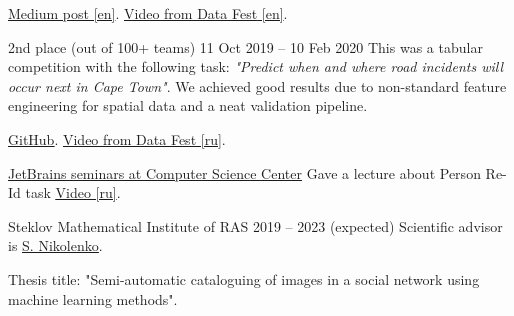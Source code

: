 \documentclass[10pt,a4paper,ragged2e,withhyper]{altacv}
\begin{document}
\begin{paracol}{2}
\href{https://medium.com/pytorch/metric-learning-with-catalyst-8c8337dfab1a}{\underline{Medium post} [en]}. \href{https://www.youtube.com/watch?v=a7sDJMDatZ4}{\underline{Video from Data Fest} [en]}.

\divider

{2nd place (out of 100+ teams)}
{11 Oct 2019 -- 10 Feb 2020}{}
This was a tabular competition with the following task: \textit{"Predict when and where road incidents will occur next in Cape Town"}. We achieved good results due to non-standard feature engineering for spatial data and a neat validation pipeline.
\smallskip

\href{https://github.com/AlekseySh/uber_competition}{\underline{GitHub}}.
\href{https://youtu.be/CliQ-EiYv5A}{\underline{Video from Data Fest} [ru]}.

\divider

\cvevent
{\href{https://research.jetbrains.org/groups/plt_lab/seminars}{JetBrains seminars at Computer Science Center}}
{Gave a lecture about Person Re-Id task}
{}
{}
{\href{https://youtu.be/O8qtBYeOSKE}{\underline{Video} [ru]}.}

\switchcolumn


\divider


\divider


\cvtag{\LaTeX}


{Steklov Mathematical Institute of RAS}
{2019 -- 2023 (expected)}{}
Scientific advisor is \href{https://logic.pdmi.ras.ru/~sergey/}
{\underline{S. Nikolenko}}.

\divider

Thesis title: "Semi-automatic cataloguing of images in a social network using machine learning methods".

\divider


\end{paracol}
\end{document}
